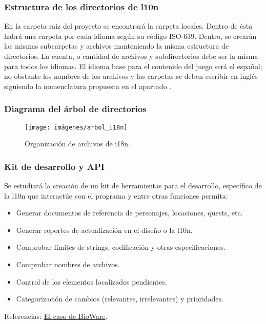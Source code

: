 \subsubsection{Estructura de los directorios de l10n}
En la carpeta raíz del proyecto se encontrará la carpeta locales. Dentro de ésta habrá una carpeta por cada idioma según su código ISO-639. Dentro, se crearán las mismas subcarpetas y archivos manteniendo la misma estructura de directorios. La cuenta, o cantidad de archivos y subdirectorios debe ser la misma para todos los idiomas. El idioma base para el contenido del juego será el español; no obstante los nombres de los archivos y las carpetas se deben escribir en inglés siguiendo la nomenclatura propuesta en el apartado .

\subsubsection{Diagrama del árbol de directorios}\label{i18n:arbol-de-directorios}

\begin{figure}[H]
	\centering
	\texttt{[image: imágenes/arbol\_i18n]}
	\caption{Organización de archivos de i18n.}
	\label{fig:arbolinternacionalizacion}
\end{figure}

\subsubsection{Kit de desarrollo y API}\label{i18n:toolkit-y-api}
Se estudiará la creación de un kit de herramientas para el desarrollo, específico de la l10n que interactúe con el programa y entre otras funciones permita:
\begin{itemize}
	\item Generar documentos de referencia de personajes, locaciones, quests, etc.
	\item Generar reportes de actualización en el diseño o la l10n.
	\item Comprobar límites de strings, codificación y otras especificaciones.
	\item Comprobar nombres de archivos.
	\item Control de los elementos localizados pendientes.
	\item Categorización de cambios (relevantes, irrelevantes) y prioridades.
\end{itemize}
Referencias: \href{https://drive.google.com/file/d/1OJxibGWbvxJq3_8WwmR93yzCCCvq7iu-/view?usp=sharing}{El caso de BioWare}.


